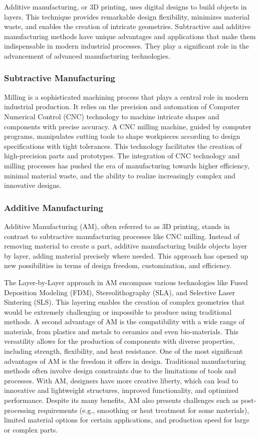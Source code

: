 \documentclass[ZLstudentexpose%
              ,optBiber%
              ,optEnglish%
              ,10pt
              ]{ZLlatex}%
\begin{document}
Additive manufacturing, or 3D printing, uses digital designs to build objects in layers. This technique provides remarkable design flexibility, minimizes material waste, and enables the creation of intricate geometries. Subtractive and additive manufacturing methods have unique advantages and applications that make them indispensable in modern industrial processes. They play a significant role in the advancement of advanced manufacturing technologies.



\subsubsection{Subtractive Manufacturing}
Milling is a sophisticated machining process that plays a central role in modern industrial production. It relies on the precision and automation of Computer Numerical Control (CNC) technology to machine intricate shapes and components with precise accuracy. A CNC milling machine, guided by computer programs, manipulates cutting tools to shape workpieces  according to design specifications with tight tolerances. This technology facilitates the creation of high-precision parts and prototypes. The integration of CNC technology and milling processes has pushed the era of manufacturing towards higher efficiency, minimal material waste, and the ability to realize increasingly complex and innovative designs.
\newpage
\subsubsection{Additive Manufacturing}
Additive Manufacturing (AM), often referred to as 3D printing, stands in contrast to subtractive manufacturing processes like CNC milling. Instead of removing material to create a part, additive manufacturing builds objects layer by layer, adding material precisely where needed. This approach has opened up new possibilities in terms of design freedom, customization, and efficiency.

The Layer-by-Layer approach in AM encompass various technologies like Fused Deposition Modeling (FDM), Stereolithography (SLA), and Selective Laser Sintering (SLS). This layering enables the creation of complex geometries that would be extremely challenging or impossible to produce using traditional methods.
A second advantage of AM is the compatibility with a wide range of materials, from plastics and metals to ceramics and even bio-materials. This versatility allows for the production of components with diverse properties, including strength, flexibility, and heat resistance. One of the most significant advantages of AM is the freedom it offers in design. Traditional manufacturing methods often involve design constraints due to the limitations of tools and processes. With AM, designers have more creative liberty, which can lead to innovative and lightweight structures, improved functionality, and optimized performance.
Despite its many benefits, AM also presents challenges such as post-processing requirements (e.g., smoothing or heat treatment for some materials), limited material options for certain applications, and production speed for large or complex parts.
\end{document}
